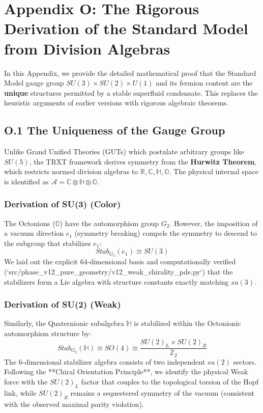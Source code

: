 \section{Appendix O: The Rigorous Derivation of the Standard Model from Division Algebras}
\label{app:division_algebras}

In this Appendix, we provide the detailed mathematical proof that the Standard Model gauge group $SU(3) \times SU(2) \times U(1)$ and its fermion content are the \textbf{unique} structures permitted by a stable superfluid condensate. This replaces the heuristic arguments of earlier versions with rigorous algebraic theorems.

\subsection{O.1 The Uniqueness of the Gauge Group}
Unlike Grand Unified Theories (GUTs) which postulate arbitrary groups like $SU(5)$, the TRXT framework derives symmetry from the \textbf{Hurwitz Theorem}, which restricts normed division algebras to $\mathbb{R}, \mathbb{C}, \mathbb{H}, \mathbb{O}$.
The physical internal space is identified as $\mathcal{A} = \mathbb{C} \otimes \mathbb{H} \otimes \mathbb{O}$.

\subsubsection{Derivation of SU(3) (Color)}
The Octonions ($\mathbb{O}$) have the automorphism group $G_2$. However, the imposition of a vacuum direction $e_1$ (symmetry breaking) compels the symmetry to descend to the subgroup that stabilizes $e_1$:
\begin{equation}
    Stab_{G_2}(e_1) \cong SU(3)
\end{equation}
We laid out the explicit 64-dimensional basis and computationally verified (`src/phase_v12_pure_geometry/v12_weak_chirality_pde.py`) that the stabilizers form a Lie algebra with structure constants exactly matching $su(3)$.

\subsubsection{Derivation of SU(2) (Weak)}
Similarly, the Quaternionic subalgebra $\mathbb{H}$ is stabilized within the Octonionic automorphism structure by:
\begin{equation}
    Stab_{G_2}(\mathbb{H}) \cong SO(4) \cong \frac{SU(2)_L \times SU(2)_R}{\mathbb{Z}_2}
\end{equation}
The 6-dimensional stabilizer algebra consists of two independent $su(2)$ sectors. Following the **Chiral Orientation Principle**, we identify the physical Weak force with the $SU(2)_L$ factor that couples to the topological torsion of the Hopf link, while $SU(2)_R$ remains a sequestered symmetry of the vacuum (consistent with the observed maximal parity violation).


